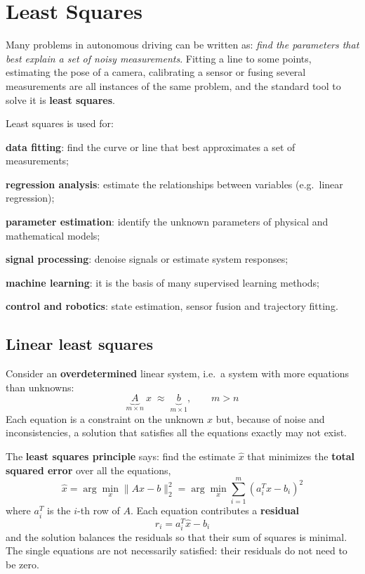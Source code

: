 \section{Least Squares}\label{sec:least-squares}

Many problems in autonomous driving can be written as: \emph{find the parameters that best explain a set of noisy measurements}.
Fitting a line to some points, estimating the pose of a camera, calibrating a sensor or fusing several measurements are all instances of the same problem, and the standard tool to solve it is \textbf{least squares}.

Least squares is used for:
\begin{compactitemize}
    \item \textbf{data fitting}: find the curve or line that best approximates a set of measurements;
    \item \textbf{regression analysis}: estimate the relationships between variables (e.g.\ linear regression);
    \item \textbf{parameter estimation}: identify the unknown parameters of physical and mathematical models;
    \item \textbf{signal processing}: denoise signals or estimate system responses;
    \item \textbf{machine learning}: it is the basis of many supervised learning methods;
    \item \textbf{control and robotics}: state estimation, sensor fusion and trajectory fitting.
\end{compactitemize}

\subsection{Linear least squares}
Consider an \textbf{overdetermined} linear system, i.e.\ a system with more equations than unknowns:
\[
\underbrace{A}_{m\times n}\ x \;\approx\; \underbrace{b}_{m\times1}, \qquad m > n
\]
Each equation is a constraint on the unknown $x$ but, because of noise and inconsistencies, a solution that satisfies all the equations exactly may not exist.

The \textbf{least squares principle} says: find the estimate $\hat{x}$ that minimizes the \textbf{total squared error} over all the equations,
\[
\hat{x} = \arg\min_x \|Ax - b\|_2^2 = \arg\min_x \sum_{i=1}^{m} \left(a_i^T x - b_i\right)^2
\]
where $a_i^T$ is the $i$-th row of $A$.
Each equation contributes a \textbf{residual}
\[
r_i = a_i^T \hat{x} - b_i
\]
and the solution balances the residuals so that their sum of squares is minimal.
The single equations are not necessarily satisfied: their residuals do not need to be zero.

